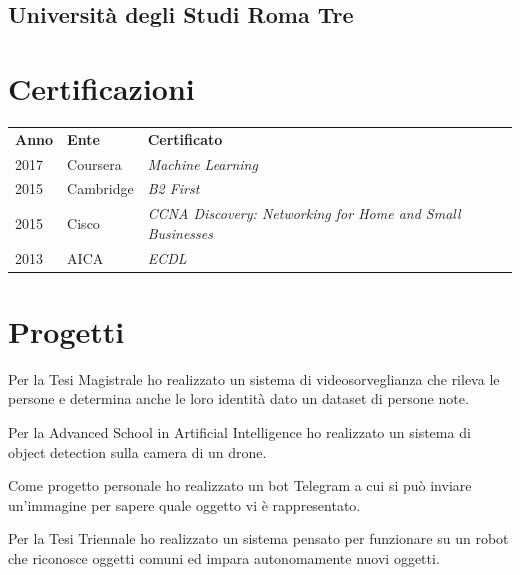 \documentclass[]{deedy-resume-openfont}
\begin{document}
\begin{minipage}[t]{0.66\textwidth}
\subsection{Università degli Studi Roma Tre}
\sectionsep


\section{Certificazioni}
\begin{tabular}{@{}lll@{}}
\textbf{Anno} & \textbf{Ente} & \textbf{Certificato} \\
2017          & Coursera      & \textit{Machine Learning} \\
2015	      & Cambridge     & \textit{B2 First} \\
2015	      & Cisco         & \textit{CCNA Discovery: Networking for Home and Small Businesses} \\
2013	      & AICA          & \textit{ECDL} \\
\end{tabular}
\sectionsep


\section{Progetti}

Per la Tesi Magistrale ho realizzato un sistema di videosorveglianza che rileva le persone e determina anche le loro identità dato un dataset di persone note.

Per la Advanced School in Artificial Intelligence ho realizzato un sistema di object detection sulla camera di un drone.

Come progetto personale ho realizzato un bot Telegram a cui si può inviare un'immagine per sapere quale oggetto vi è rappresentato.

Per la Tesi Triennale ho realizzato un sistema pensato per funzionare su un robot che riconosce oggetti comuni ed impara autonomamente nuovi oggetti.

\end{minipage} 
\end{document}
